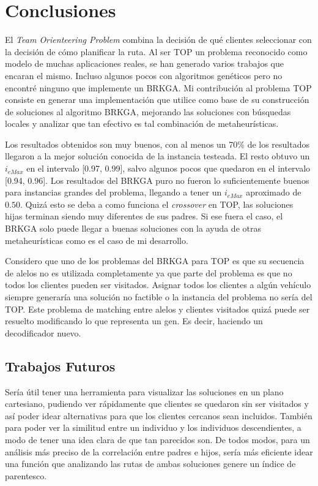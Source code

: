\chapter{Conclusiones}

\bigskip

El \textit{Team Orienteering Problem} combina la decisión de qué clientes seleccionar con la decisión de cómo planificar la ruta. Al ser TOP un problema reconocido como modelo de muchas aplicaciones reales, se han generado varios trabajos que encaran el mismo. Incluso algunos pocos con algoritmos genéticos pero no encontré ninguno que implemente un BRKGA. Mi contribución al problema TOP consiste en generar una implementación que utilice como base de su construcción de soluciones al algoritmo BRKGA, mejorando las soluciones con búsquedas locales y analizar que tan efectivo es tal combinación de metaheurísticas.

\bigskip

Los resultados obtenidos son muy buenos, con al menos un 70\% de los resultados llegaron a la mejor solución conocida de la instancia testeada. El resto obtuvo un $i_{eMax}$ en el intervalo [0.97, 0.99], salvo algunos pocos que quedaron en el intervalo [0.94, 0.96]. Los resultados del BRKGA puro no fueron lo suficientemente buenos para instancias grandes del problema, llegando a tener un $i_{eMax}$ aproximado de $0.50$. Quizá esto se deba a como funciona el \textit{crossover} en TOP, las soluciones hijas terminan siendo muy diferentes de sus padres. Si ese fuera el caso, el BRKGA solo puede llegar a buenas soluciones con la ayuda de otras metaheurísticas como es el caso de mi desarrollo.

\bigskip

Considero que uno de los problemas del BRKGA para TOP es que su secuencia de alelos no es utilizada completamente ya que parte del problema es que no todos los clientes pueden ser visitados. Asignar todos los clientes a algún vehículo siempre generaría una solución no factible o la instancia del problema no sería del TOP. Este problema de matching entre alelos y clientes visitados quizá puede ser resuelto modificando lo que representa un gen. Es decir, haciendo un decodificador nuevo.

\section{Trabajos Futuros}

Sería útil tener una herramienta para visualizar las soluciones en un plano cartesiano, pudiendo ver rápidamente que clientes se quedaron sin ser visitados y así poder idear alternativas para que los clientes cercanos sean incluidos. También para poder ver la similitud entre un individuo y los individuos descendientes, a modo de tener una idea clara de que tan parecidos son. De todos modos, para un análisis más preciso de la correlación entre padres e hijos, sería más eficiente idear una función que analizando las rutas de ambas soluciones genere un índice de parentesco.

